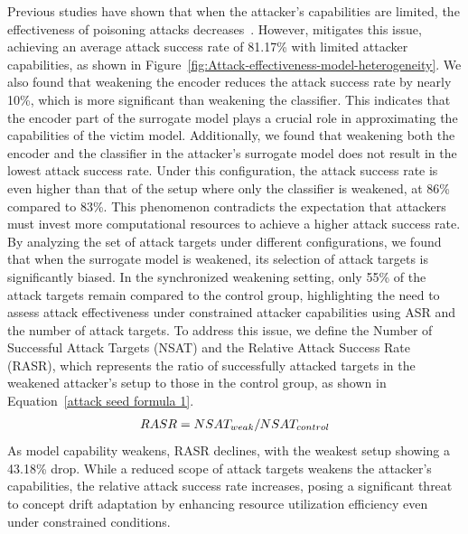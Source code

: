 Previous studies have shown that when the attacker’s capabilities are limited, the effectiveness of poisoning attacks decreases~\cite{2022-ACM-Computing-Survey-Threats-to-training}.
However, \pandora mitigates this issue, achieving an average attack success rate of 81.17\% with limited attacker capabilities, as shown in Figure~\ref{fig:Attack-effectiveness-model-heterogeneity}. 
We also found that weakening the encoder reduces the attack success rate by nearly 10\%, which is more significant than weakening the classifier.  
This indicates that the encoder part of the surrogate model plays a crucial role in approximating the capabilities of the victim model.
Additionally, we found that weakening both the encoder and the classifier in the attacker’s surrogate model does not result in the lowest attack success rate.
Under this configuration, the attack success rate is even higher than that of the setup where only the classifier is weakened, at 86\% compared to 83\%.
This phenomenon contradicts the expectation that attackers must invest more computational resources to achieve a higher attack success rate.
By analyzing the set of attack targets under different configurations, we found that when the surrogate model is weakened, its selection of attack targets is significantly biased.
In the synchronized weakening setting, only 55\% of the attack targets remain compared to the control group, highlighting the need to assess attack effectiveness under constrained attacker capabilities using ASR and the number of attack targets.
To address this issue, we define the Number of Successful Attack Targets (NSAT) and the Relative Attack Success Rate (RASR), which represents the ratio of successfully attacked targets in the weakened attacker’s setup to those in the control group, as shown in Equation~\ref{attack seed formula 1}.
\begin{equation}
	\begin{aligned}
		RASR = \small NSAT_{weak}/\small NSAT_{control}
	\end{aligned}
	\label{attack seed formula 1}
\end{equation}
As model capability weakens, RASR declines, with the weakest setup showing a 43.18\% drop.
While a reduced scope of attack targets weakens the attacker’s capabilities, the relative attack success rate increases, posing a significant threat to concept drift adaptation by enhancing resource utilization efficiency even under constrained conditions.

